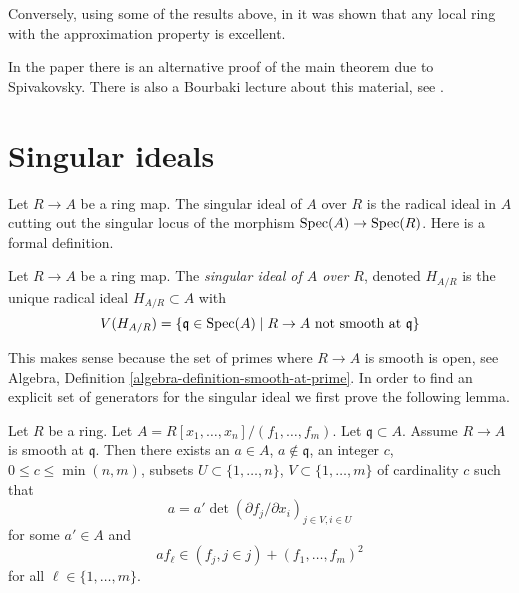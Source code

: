 \medskip\noindent
Conversely, using some of the results above, in \cite{Rotthaus-excellent}
it was shown that any local ring with the approximation property is excellent.

\medskip\noindent
In the paper \cite{Spivakovsky} there is an alternative proof of the
main theorem due to Spivakovsky. There is also a Bourbaki lecture about
this material, see \cite{Teissier}.





\section{Singular ideals}
\label{section-singular-ideal}

\noindent
Let $R \to A$ be a ring map. The singular ideal of $A$ over $R$
is the radical ideal in $A$ cutting out the singular locus of the
morphism $\mathop{\rm Spec}(A) \to \mathop{\rm Spec}(R)$. Here is a formal definition.

\begin{definition}
\label{definition-singular-ideal}
Let $R \to A$ be a ring map. The {\it singular ideal of $A$ over $R$},
denoted $H_{A/R}$ is the unique radical ideal $H_{A/R} \subset A$ with
$$
V(H_{A/R}) = \{\mathfrak q \in \mathop{\rm Spec}(A) \mid R \to A
\text{ not smooth at }\mathfrak q\}
$$
\end{definition}

\noindent
This makes sense because the set of primes where $R \to A$ is smooth
is open, see
Algebra, Definition \ref{algebra-definition-smooth-at-prime}.
In order to find an explicit set
of generators for the singular ideal we first prove the following lemma.

\begin{lemma}
\label{lemma-find-strictly-standard}
Let $R$ be a ring. Let $A = R[x_1, \ldots, x_n]/(f_1, \ldots, f_m)$.
Let $\mathfrak q \subset A$. Assume $R \to A$ is smooth
at $\mathfrak q$. Then there exists an $a \in A$, $a \not \in \mathfrak q$,
an integer $c$, $0 \leq c \leq \min(n, m)$, subsets
$U \subset \{1, \ldots, n\}$, $V \subset \{1, \ldots, m\}$
of cardinality $c$ such that
$$
a = a' \det(\partial f_j/\partial x_i)_{j \in V, i \in U}
$$
for some $a' \in A$ and
$$
a f_\ell \in (f_j, j \in j) + (f_1, \ldots, f_m)^2
$$
for all $\ell \in \{1, \ldots, m\}$.
\end{lemma}

